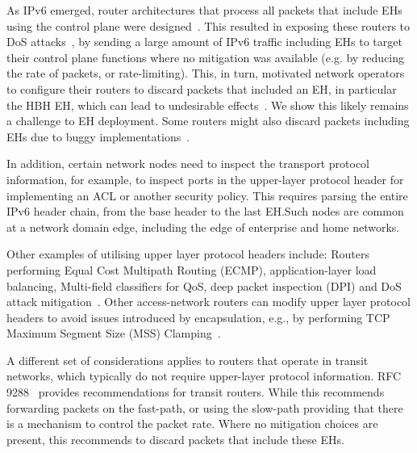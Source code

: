 \documentclass[conference]{IEEEtran}
\begin{document}
As IPv6 emerged, router architectures that process all packets that include EHs using the control plane were designed~\cite{ietf-v6ops-hbh-03}.  This resulted in exposing these routers to DoS attacks~\cite{naagas2021deh}, by sending a large amount of IPv6 traffic including EHs to target their control plane functions where no mitigation was available (e.g. by reducing the rate of packets, or rate-limiting). This, in turn, motivated network operators to configure their routers to discard packets that included an EH, in particular the HBH EH, which can lead to undesirable effects~\cite{passive-threats}. We show this likely remains a challenge to EH deployment.
Some routers might also discard packets including EHs due to buggy implementations~\cite{passive-threats}.

In addition, certain network nodes need to inspect the transport protocol information, for example, to inspect ports in the upper-layer protocol header for implementing an ACL or another security policy.
This requires parsing the entire IPv6 header chain, from the base header to the last EH.Such nodes are common at a network domain edge, including the edge of enterprise and home networks.

Other examples of utilising upper layer protocol headers include: Routers performing Equal Cost Multipath Routing (ECMP), application-layer load balancing, Multi-field classifiers for QoS, deep packet inspection (DPI) and DoS attack mitigation~\cite{lb-classification}. Other access-network routers can modify upper layer protocol headers to avoid issues introduced by encapsulation, e.g., by performing TCP Maximum Segment Size (MSS) Clamping~\cite{custura-mtu}.


A different set of considerations applies to routers that operate in transit networks, which typically do not require upper-layer protocol information.
RFC 9288~\cite{rfc9288}  provides recommendations for transit routers. While this recommends forwarding packets on the fast-path, or using the slow-path providing that there is a mechanism to control the  packet rate. Where no mitigation choices are present, this recommends to discard packets that include these EHs. 


\end{document}
